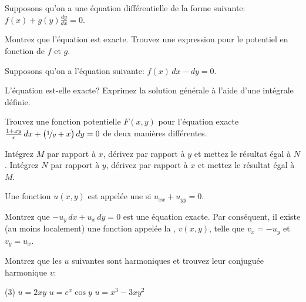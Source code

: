 \begin{exercise}
	Supposons qu'on a une équation différentielle de la forme suivante:
	$f(x) + g(y) \frac{dy}{dx} = 0$.
	\begin{tasks}
		\task Montrez que l'équation est exacte.
		\task Trouvez une expression pour le potentiel en fonction de $f$ et $g$.
	\end{tasks}
\end{exercise}

\begin{exercise}
	Supposons qu'on a l'équation suivante: $f(x) \, dx - dy = 0$.
	\begin{tasks}
		\task L'équation est-elle exacte?
		\task Exprimez la solution générale à l'aide d'une intégrale définie.
	\end{tasks}
\end{exercise}

\begin{exercise}
	Trouvez une fonction potentielle $F(x,y)$ pour l'équation exacte
	$\frac{1+xy}{x}\, dx + \bigl(\nicefrac{1}{y} + x \bigr) \, dy = 0$ de deux manières différentes.
	\begin{tasks}
		\task Intégrez $M$ par rapport à $x$, dérivez par rapport à $y$ et mettez le résultat égal à $N$.
		\task Intégrez $N$ par rapport à $y$, dérivez par rapport à $x$ et mettez le résultat égal à  $M$.
	\end{tasks}
\end{exercise}

\begin{samepage}
\begin{exercise}
	Une fonction $u(x,y)$ est appelée une \emph{} si
	$u_{xx} + u_{yy} = 0$.
	\begin{tasks}
	\task Montrez que $-u_y \, dx + u_x \, dy = 0$ est une équation exacte.
			Par conséquent, il  existe (au moins localement) une fonction appelée la \emph{\myindex{conjuguée harmonique}},
			$v(x,y)$, telle que $v_x = -u_y$ et $v_y = u_x$.
	\end{tasks}
	Montrez que les $u$ suivantes sont harmoniques et trouvez leur conjuguée harmonique $v$:
	\begin{tasks}[resume](3)
		\task $u = 2xy$
		\task $u = e^x \cos y$
		\task $u = x^3-3xy^2$
	\end{tasks}
	\end{exercise}
\end{samepage}

\setcounter{exercise}{100}  %

